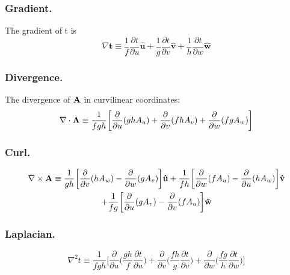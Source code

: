 \documentclass[../main.tex]{subfiles}
\begin{document}
\subsubsection*{Gradient.} The gradient of t is
\begin{equation*}
    \nabla \mathbf{t} \equiv \frac{1}{f}\frac{\partial t}{\partial u}\mathbf{\hat{u}}+ \frac{1}{g}\frac{\partial t}{\partial v}\mathbf{\hat{v}}+ \frac{1}{h}\frac{\partial t}{\partial w}\mathbf{\hat{w}}
\end{equation*}

\subsubsection*{Divergence.} The divergence of $\mathbf{A}$ in curvilinear coordinates:
\begin{equation*}
    \nabla \cdot \mathbf{A}\equiv \frac{1}{fgh} \biggl[ \frac{\partial}{\partial u} (ghA_u)+ \frac{\partial}{\partial v} (fh A_v)+\frac{\partial}{\partial w} (fg A_w)\biggr]
\end{equation*}

\subsubsection*{Curl.} 
\begin{multline*}
    \nabla \times \mathbf{A}\equiv \frac{1}{gh} \biggl[\frac{\partial}{\partial v} (hA_w) -\frac{\partial}{\partial w } (g A_{v}) \biggr]\mathbf{\hat{u}}
    +\frac{1}{fh} \biggl[\frac{\partial}{\partial w} (f A_{u}) -\frac{\partial}{\partial u } (h A_{w}) \biggr]\mathbf{\hat{v}}\\
    +\frac{1}{fg} \biggl[\frac{\partial}{\partial u} (g A_{v}) -\frac{\partial}{\partial v } (f A_{u}) \biggr]\mathbf{\hat{w}}
\end{multline*}

\subsubsection*{Laplacian.} 
\begin{equation*}
    \nabla^2t\equiv \frac{1}{fgh}\biggl[\frac{\partial}{\partial u}\Biggl(\frac{gh}{f}\frac{\partial t}{\partial u}\Biggr)+ \frac{\partial}{\partial v}\Biggl(\frac{fh}{g}\frac{\partial t}{\partial v} \Biggr)+ \frac{\partial}{\partial w}\Biggl(\frac{fg}{h}\frac{\partial t}{\partial w}\Biggr)\biggr]
\end{equation*}
\end{document}
